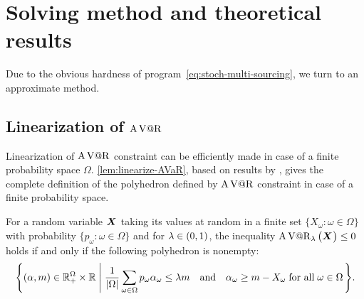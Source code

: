 \section{Solving method and theoretical results}
\label{sec:multi-sourcing:stochastic:solving-method}


Due to the obvious hardness of program~\eqref{eq:stoch-multi-sourcing}, we turn to an approximate method.


\subsection{Linearization of $\operatorname{A\operatorname{V@R}}$}
\label{sec:multi-sourcing:stochastic:avar-linearization}


Linearization of $\operatorname{A\operatorname{V@R}}$ constraint can be efficiently made in case of a finite probability space $\Omega$.
\cref{lem:linearize-AVaR}, based on results by \citet{Rockafellar2000}, gives the complete definition of the polyhedron defined by $\operatorname{A\operatorname{V@R}}$ constraint in case of a finite probability space.


\begin{lem}\label{lem:linearize-AVaR}
For a random variable $\va X$ taking its values at random in a finite set $\{X_{\omega}\colon\omega\in\Omega\}$ with probability $\{p_{\omega}\colon\omega\in\Omega\}$ and for $\lambda\in\bracket{0,1}$, the inequality 
$\AVaR_{\lambda}\bracket{\va X} \le 0$ holds if and only if the following polyhedron is nonempty:
$$
\left\{
\bracket{\alpha,m}\in\RR_+^{\Omega}\times\RR
\;\left|\;
\frac{1}{\card{\Omega}}\sum_{\omega\in\Omega}p_{\omega}\alpha_{\omega}\leq \lambda m
\quad\mbox{\textup{and}}\quad
\alpha_{\omega}\geq m-X_{\omega}\;
\mbox{\textup{for all}}\;\omega\in\Omega
\right.
\right\}.
$$
\end{lem}


